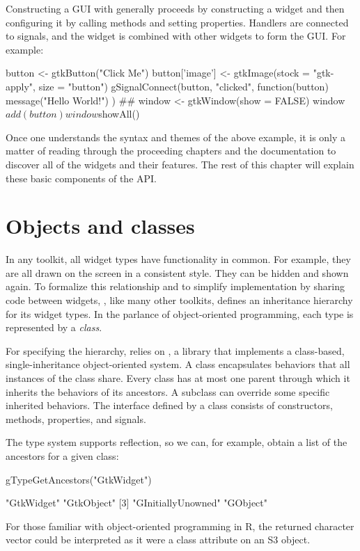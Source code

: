 Constructing a GUI with  generally proceeds by constructing
a widget and then configuring it by calling methods and setting
properties. Handlers are connected to signals, and the widget is
combined with other widgets to form the GUI. For example:
\begin{Schunk}
\begin{Sinput}
 button <- gtkButton("Click Me")
 button['image'] <- gtkImage(stock = "gtk-apply", 
                             size = "button")
 gSignalConnect(button, "clicked", function(button) {
   message("Hello World!")
 })
 ##
 window <- gtkWindow(show = FALSE)
 window$add(button)
 window$showAll()
\end{Sinput}
\end{Schunk}
% 
Once one understands the syntax and themes of the above example, it is
only a matter of reading through the proceeding chapters and the
documentation to discover all of the widgets and their features. The
rest of this chapter will explain these basic components of the API.

\section{Objects and classes}

In any toolkit, all widget types have functionality in common. For
example, they are all drawn on the screen in a consistent style. They
can be hidden and shown again. To formalize this relationship and to
simplify implementation by sharing code between widgets, \GTK\/,
like many other toolkits, defines an inheritance hierarchy for its
widget types. In the parlance of object-oriented programming, each
type is represented by a \textit{class}.

For specifying the hierarchy, \GTK\/ relies on , a
 library that implements a class-based, single-inheritance
object-oriented system. A  class encapsulates behaviors
that all instances of the class share. Every class has at most one
parent through which it inherits the behaviors of its ancestors. A
subclass can override some specific inherited behaviors. The interface
defined by a class consists of constructors, methods, properties,
and signals. 

The type system supports reflection, so we can, for example, obtain a
list of the ancestors for a given class:
\begin{Schunk}
\begin{Sinput}
 gTypeGetAncestors("GtkWidget")
\end{Sinput}
\begin{Soutput}
[1] "GtkWidget"         "GtkObject"        
[3] "GInitiallyUnowned" "GObject"          
\end{Soutput}
\end{Schunk}
%
For those familiar with object-oriented programming in R, the returned
character vector could be interpreted as it were a class attribute on
an S3 object.

